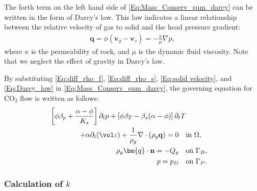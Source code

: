 The forth term on the left hand side of \eqref{Eq:Mass_Conserv_sum_darcy} can be written in the form of Darcy's law. This law indicates a linear relationship between the relative velocity of gas to solid and the head pressure gradient:
\begin{equation}\label{Eq:Darcy_law}
\begin{aligned}
\mathbf{q} = \phi \left(\mathbf{v}_g-\mathbf{v}_s \right) = -\frac{\kappa}{\mu} \nabla p,
\end{aligned}
\end{equation}
where $\kappa$ is the permeability of rock, and $\mu$ is the dynamic fluid viscosity. 
Note that we neglect the effect of gravity in Darcy's law. %

By substituting \eqref{Eq:diff_rho_f}, \eqref{Eq:diff_rho_s}, \eqref{Eq:solid velocity}, and \eqref{Eq:Darcy_law} in \eqref{Eq:Mass_Conserv_sum_darcy}, the governing equation for CO$_2$ flow is written as follows:
\begin{equation}\label{Eq:General_pressure}
\begin{aligned}
\left[\phi\beta_p +\frac{\alpha-\phi}{K_s}\right]\partial_t p+\left[\phi\beta_T-\beta_s(\alpha-\phi)\right]\partial_t T\\+\alpha \partial_t(\vol\varepsilon)+\frac{1}{\rho_g}\nabla\cdot \left(\rho_g\mathbf{q}\right)=0 \quad &\text{in~} \Omega,\\
\rho_g\bm{q} \cdot \mathbf{n} =-Q_g \quad  &\text{on~} \Gamma_B,\\
p = p_D \quad &\text{on~}\Gamma_P.
\end{aligned}
\end{equation}
\subsubsection{Calculation of $k$}
